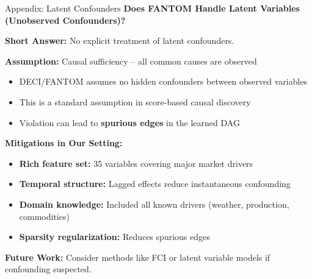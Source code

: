\documentclass[aspectratio=169]{beamer}
\begin{document}
\begin{frame}{Appendix: Latent Confounders}
\textbf{Does FANTOM Handle Latent Variables (Unobserved Confounders)?}

\vspace{0.3cm}
\textbf{Short Answer:} No explicit treatment of latent confounders.

\vspace{0.3cm}
\textbf{Assumption:} Causal sufficiency -- all common causes are observed
\begin{itemize}
    \item DECI/FANTOM assumes no hidden confounders between observed variables
    \item This is a standard assumption in score-based causal discovery
    \item Violation can lead to \textbf{spurious edges} in the learned DAG
\end{itemize}

\vspace{0.3cm}
\textbf{Mitigations in Our Setting:}
\begin{itemize}
    \item \textbf{Rich feature set:} 35 variables covering major market drivers
    \item \textbf{Temporal structure:} Lagged effects reduce instantaneous confounding
    \item \textbf{Domain knowledge:} Included all known drivers (weather, production, commodities)
    \item \textbf{Sparsity regularization:} Reduces spurious edges
\end{itemize}

\vspace{0.3cm}
\textbf{Future Work:} Consider methods like FCI or latent variable models if confounding suspected.
\end{frame}
\end{document}
